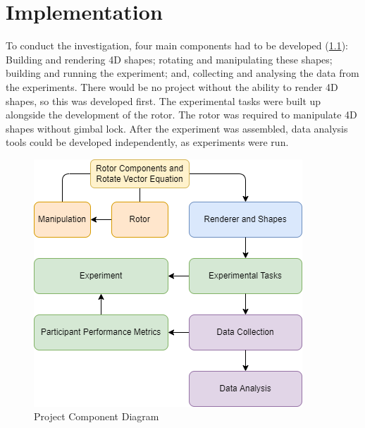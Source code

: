 \documentclass{l4proj}
\begin{document}
\chapter{Implementation}

\noindent
\begin{minipage}[c]{0.45\linewidth}
  To conduct the investigation, four main components had to be developed (\cref{fig:components}): Building and rendering 4D shapes; rotating and manipulating these shapes; building and running the experiment; and, collecting and analysing the data from the experiments.
  There would be no project without the ability to render 4D shapes, so this was developed first. The experimental tasks were built up alongside the development of the rotor. The rotor was required to manipulate 4D shapes without gimbal lock. After the experiment was assembled, data analysis tools could be developed independently, as experiments were run.
\end{minipage} 
\hspace{0.8cm}
\begin{minipage}[c]{0.4\linewidth}
  \begin{figure}[H]
    \centering
    \includegraphics[width=\textwidth]{images/Implementation Schema.drawio.png}
  \caption{Project Component Diagram}
  \label{fig:components}
  \end{figure}
\end{minipage}
\end{document}
